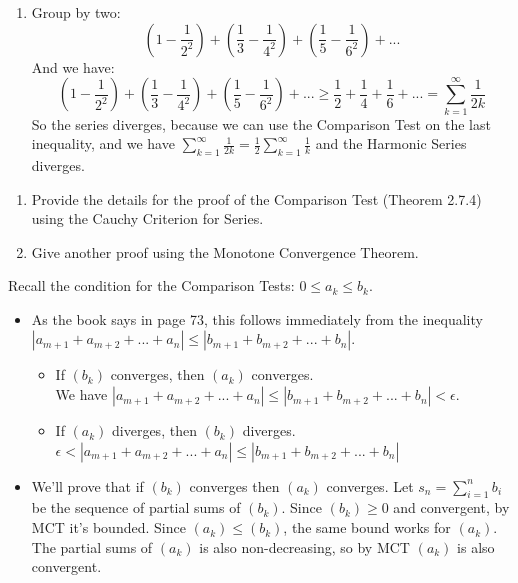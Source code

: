 \documentclass{oxmathproblems}
\begin{document}
\begin{questions}
\begin{solution}
\begin{enumerate}[label=(\alph*)]
    \item Group by two:
    \[(1 - \frac{1}{2^2}) + (\frac{1}{3} - \frac{1}{4^2}) + (\frac{1}{5} - \frac{1}{6^2}) + ...\]
    And we have:
    \[(1 - \frac{1}{2^2}) + (\frac{1}{3} - \frac{1}{4^2}) + (\frac{1}{5} - \frac{1}{6^2}) + ... \geq \frac{1}{2} + \frac{1}{4} + \frac{1}{6} + ... = \sum_{k=1}^{\infty}\frac{1}{2k}\]
    So the series diverges, because we can use the Comparison Test on the last inequality, and we have
    $\sum_{k=1}^{\infty}\frac{1}{2k} = \frac{1}{2}\sum_{k=1}^{\infty}\frac{1}{k}$ and the Harmonic Series diverges.
  \end{enumerate}
\end{solution}

\miquestion
\begin{enumerate}[label=(\alph*)]
  \item Provide the details for the proof of the Comparison Test (Theorem 2.7.4) using the Cauchy Criterion for Series.
  \item Give another proof using the Monotone Convergence Theorem.
\end{enumerate}

\begin{solution}
   Recall the condition for the Comparison Tests: $0 \leq a_{k} \leq b_{k}$.
  \begin{itemize}
    \item As the book says in page 73, this follows immediately from the inequality $|a_{m+1} + a_{m+2} + ... + a_{n}| \leq |b_{m+1} + b_{m+2} + ... + b_{n}|$.
    
    \begin{itemize}
      \item If $(b_{k})$ converges, then $(a_{k})$ converges. \\
      We have $|a_{m+1} + a_{m+2} + ... + a_{n}| \leq |b_{m+1} + b_{m+2} + ... + b_{n}| < \epsilon$.

      \item If $(a_{k})$ diverges, then $(b_{k})$ diverges. \\
      $\epsilon < |a_{m+1} + a_{m+2} + ... + a_{n}| \leq |b_{m+1} + b_{m+2} + ... + b_{n}|$
    \end{itemize}

    \item We'll prove that if $(b_{k})$ converges then $(a_{k})$ converges. Let $s_{n} = \sum_{i=1}^{n} b_{i}$ be the sequence of partial sums of $(b_{k})$.
    Since $(b_{k}) \geq 0$ and convergent, by MCT it's bounded. Since $(a_{k}) \leq (b_{k})$, the same bound works for $(a_{k})$. The partial sums of $(a_{k})$
    is also non-decreasing, so by MCT $(a_{k})$ is also convergent.
    

\end{itemize}
\end{solution}
\end{questions}
\end{document}
